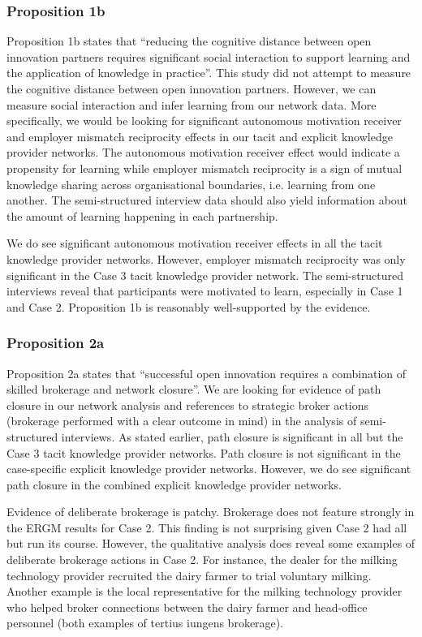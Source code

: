 \subsubsection{Proposition 1b}

Proposition 1b states that \enquote{reducing the cognitive distance between open innovation partners requires significant social interaction to support learning and the application of knowledge in practice}. This study did not attempt to measure the cognitive distance between open innovation partners. However, we can measure social interaction and infer learning from our network data. More specifically, we would be looking for significant autonomous motivation receiver and employer mismatch reciprocity effects in our tacit and explicit knowledge provider networks. The autonomous motivation receiver effect would indicate a propensity for learning while employer mismatch reciprocity is a sign of mutual knowledge sharing across organisational boundaries, i.e. learning from one another. The semi-structured interview data should also yield information about the amount of learning happening in each partnership. \medskip

We do see significant autonomous motivation receiver effects in all the tacit knowledge provider networks. However, employer mismatch reciprocity was only significant in the Case 3 tacit knowledge provider network. The semi-structured interviews reveal that participants were motivated to learn, especially in Case 1 and Case 2. Proposition 1b is reasonably well-supported by the evidence. 

\subsubsection{Proposition 2a}

Proposition 2a states that \enquote{successful open innovation requires a combination of skilled brokerage and network closure}. We are looking for evidence of path closure in our network analysis and references to strategic broker actions (brokerage performed with a clear outcome in mind) in the analysis of semi-structured interviews. As stated earlier, path closure is significant in all but the Case 3 tacit knowledge provider networks. Path closure is not significant in the case-specific explicit knowledge provider networks. However, we do see significant path closure in the combined explicit knowledge provider networks. \medskip

Evidence of deliberate brokerage is patchy. Brokerage does not feature strongly in the ERGM results for Case 2. This finding is not surprising given Case 2 had all but run its course. However, the qualitative analysis does reveal some examples of deliberate brokerage actions in Case 2. For instance, the dealer for the milking technology provider recruited the dairy farmer to trial voluntary milking. Another example is the local representative for the milking technology provider who helped broker connections between the dairy farmer and head-office personnel (both examples of tertius iungens brokerage). \medskip


